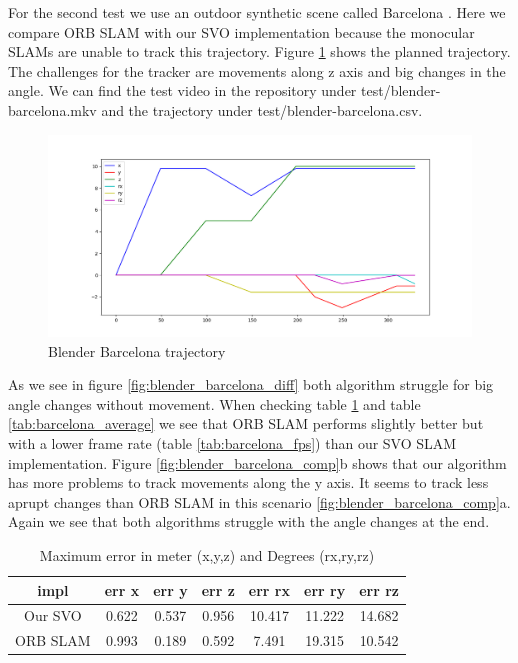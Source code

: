 \documentclass[11pt,a4paper,titlepage,oneside]{report}
\begin{document}
For the second test we use an outdoor synthetic scene called Barcelona \cite{blender}. Here we compare ORB SLAM with our SVO implementation because the monocular SLAMs are unable to track this trajectory. Figure \ref{fig:blender_barcelona_traj} shows the planned trajectory. The challenges for the tracker are movements along z axis and big changes in the angle. We can find the test video in the repository under test/blender-barcelona.mkv and the trajectory under test/blender-barcelona.csv.

\begin{figure}[H]
  \includegraphics[width=1.0\textwidth]{img/blender_barcelona_traj.png}
  \caption{Blender Barcelona trajectory}\label{fig:blender_barcelona_traj}
\end{figure}

As we see in figure \ref{fig:blender_barcelona_diff} both algorithm struggle for big angle changes without movement. When checking table \ref{tab:barcelona_maximas} and table \ref{tab:barcelona_average} we see that ORB SLAM performs slightly better but with a lower frame rate (table \ref{tab:barcelona_fps}) than our SVO SLAM implementation. Figure \ref{fig:blender_barcelona_comp}b shows that our algorithm has more problems to track movements along the y axis. It seems to track less aprupt changes than ORB SLAM in this scenario \ref{fig:blender_barcelona_comp}a. Again we see that both algorithms struggle with the angle changes at the end.

\begin{table}[H]
  \centering
  \begin{tabular}{|c|c|c|c|c|c|c|}
  impl & err x & err y & err z & err rx & err ry & err rz\\
  \hline
  Our SVO & 0.622 & 0.537 & 0.956 & 10.417 & 11.222 & 14.682\\
  ORB SLAM& 0.993 & 0.189 & 0.592 & 7.491 & 19.315 & 10.542
\end{tabular}
\caption{Maximum error in meter (x,y,z) and Degrees (rx,ry,rz)}
\label{tab:barcelona_maximas}
\end{table}
\end{document}
